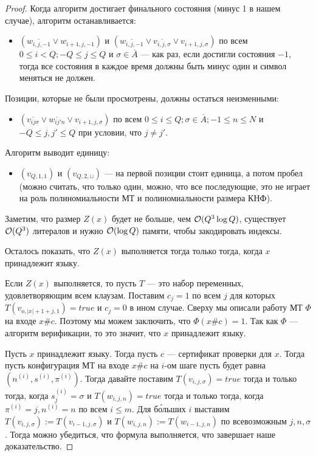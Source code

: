 \begin{proof}
  Когда алгоритм достигает финального состояния (минус 1 в нашем случае), алгоритм
  останавливается:
  \begin{itemize}
    \item $(\overline{w_{i, j, -1}} \vee w_{i + 1, j, -1})$ и 
    $(\overline{w_{i, j, -1}}\vee \overline{v_{i, j, \sigma}}\vee v_{i + 1, j, \sigma})$
    по всем $0 \leqslant i < Q; -Q \leqslant j \leqslant Q$ и $\sigma \in
    \overline{A}$ --- как раз, если достигли состояния $-1$, тогда все состояния
    в каждое время должны быть минус один и символ меняться не должен.
  \end{itemize}

  Позиции, которые не были просмотрены, должны остаться неизменными:

  \begin{itemize}
    \item $(\overline{v_{ij\sigma}}\vee \overline{w_{ij'n}}\vee v_{i+1, j, \sigma})$
    по всем $0 \leqslant i \leqslant Q; \sigma \in \overline{A}; -1 \leqslant
    n \leqslant N$ и $-Q \leqslant j, j' \leqslant Q$ при условии, что $j \neq j'$.
  \end{itemize}

  Алгоритм выводит единицу:
  \begin{itemize}
    \item $(v_{Q, 1, 1})$ и $(v_{Q, 2, \sqcup})$ --- на первой позиции стоит
    единица, а потом пробел (можно считать, что только один, можно, что все
    последующие, это не играет на роль полиномиальности МТ и полиномиальности
    размера КНФ).
  \end{itemize}

  Заметим, что размер $Z(x)$ будет не больше, чем $\mathcal{O}(Q^3\log Q)$, существует
  $\mathcal{O}(Q^3)$ литералов и нужно $\mathcal{O}(\log Q)$ памяти, чтобы закодировать индексы.

  Осталось показать, что $Z(x)$ выполняется тогда только тогда, когда $x$
  принадлежит языку.

  Если $Z(x)$ выполняется, то пусть $T$ --- это набор переменных, удовлетворяющим
  всем клаузам. Поставим $c_j = 1$ по всем $j$ для которых 
  $T(v_{o, |x| + 1 + j, 1}) = true$ и $c_j = 0$ в ином случае. Сверху мы
  описали работу МТ $\Phi$ на входе $x\#c$. Поэтому мы можем заключить, что
  $\Phi(x\#c) = 1$. Так как $\Phi$ --- алгоритм верификации, то это значит, что
  $x$ принадлежит языку.

  Пусть $x$ принадлежит языку. Тогда пусть $c$ --- сертификат проверки для $x$.
  Тогда пусть конфигурация МТ на входе $x\#c$ на $i$-ом шаге пусть будет равна 
  $(n^{(i)}, s^{(i)}, \pi^{(i)})$. Тогда давайте поставим $T(v_{i,j,\sigma}) = 
  true$ тогда и только тогда, когда $s_j^{(i)} = \sigma$ и $T(w_{i, j, n})=true$
  тогда и только тогда, когда $\pi^{(i)} = j, n^{(i)} = n$ по всем $i \leqslant m$.
  Для б\'{о}льших $i$ выставим $T(v_{i, j, \sigma}) := T(v_{i - 1, j, \sigma})$
  и $T(w_{i, j, n}) := T(w_{i - 1, j, n})$ по всевозможным $j, n, \sigma$. Тогда
  можно убедиться, что формула выполняется, что завершает наше доказательство.
\end{proof}


% 
